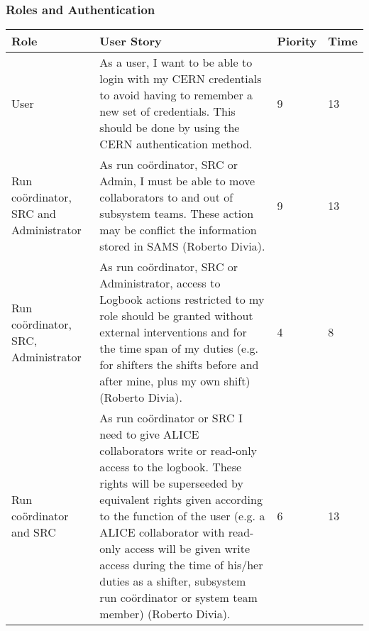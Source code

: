 \subsubsection{Roles and Authentication}
\begin{longtable}{ | p{2cm} | p{8cm} | p{1.5cm} | l |}
\hline
Role & User Story & Piority & Time \\ \hline
User & As a user, I want to be able to login with my CERN credentials to avoid having to remember a new set of credentials. This should be done by using the CERN authentication method. & 9 & 13 \\ \hline
Run coördinator, SRC and Administrator &  As run coördinator, SRC or Admin, I must be able to move collaborators to and out of subsystem teams. These action may be conflict the information stored in SAMS (Roberto Divia). & 9 & 13 \\ \hline
Run coördinator, SRC, Administrator & As run coördinator, SRC or Administrator, access to Logbook actions restricted to my role should be granted without external interventions and for the time span of my duties (e.g. for shifters the shifts before and after mine, plus my own shift) (Roberto Divia). &4 & 8\\ \hline
Run coördinator and SRC &  As run coördinator or SRC I need to give ALICE collaborators write or read-only access to the logbook. These rights will be superseeded by equivalent rights given according to the function of the user (e.g. a ALICE collaborator with read-only access will be given write access during the time of his/her duties as a shifter, subsystem run coördinator or system team member) (Roberto Divia).&6&13 \\ \hline
\end{longtable}
\newpage

